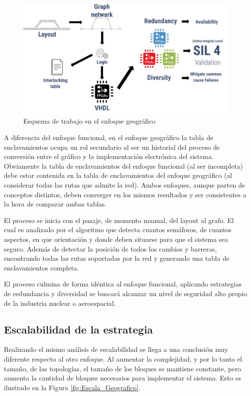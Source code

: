 		\begin{figure}[h]
		\centering
			\includegraphics[scale=.4]{./Figures/Geografico_workflow}
			\caption{Esquema de trabajo en el enfoque geográfico}
			\label{fig:Work_Geografico}
		\end{figure}
	
		A diferencia del enfoque funcional, en el enfoque geográfico la tabla de enclavamientos ocupa un rol secundario al ser un historial del proceso de conversión entre el gráfico y la implementación electrónica del sistema. Obviamente la tabla de enclavamientos del enfoque funcional (al ser incompleta) debe estar contenida en la tabla de enclavamientos del enfoque geográfico (al considerar todas las rutas que admite la red). Ambos enfoques, aunque parten de conceptos distintos, deben converger en los mismos resultados y ser consistentes a la hora de comparar ambas tablas.
		
		El proceso se inicia con el pasaje, de momento manual, del layout al grafo. El cual es analizado por el algoritmo que detecta cuantos semáforos, de cuantos aspectos, en que orientación y donde deben situarse para que el sistema sea seguro. Además de detectar la posición de todos los cambios y barreras, encontrando todas las rutas soportadas por la red y generando una tabla de enclavamientos completa.
		
		El proceso culmina de forma idéntica al enfoque funcional, aplicando estrategias de redundancia y diversidad se buscará alcanzar un nivel de seguridad alto propio de la industria nuclear o aeroespacial.
		
		\subsection{Escalabilidad de la estrategia}	
			
			Realizando el mismo análisis de escalabilidad se llega a una conclusión muy diferente respecto al otro enfoque. Al aumentar la complejidad, y por lo tanto el tamaño, de las topologías, el tamaño de los bloques se mantiene constante, pero aumenta la cantidad de bloques necesarios para implementar el sistema. Esto es ilustrado en la Figura \ref{fig:Escala_Geografico}.
					
